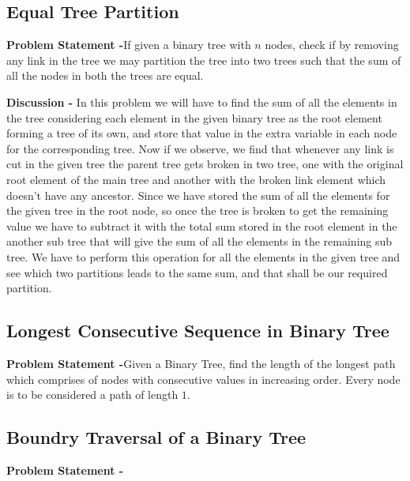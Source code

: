 \documentclass[12pt,a4paper,draft]{article}
\begin{document}
\subsection{Equal Tree Partition}
\textbf{Problem Statement -}If given a binary tree with $n$ nodes, check if by removing any link in the tree we may partition the tree into two trees such that the sum of all the nodes in both the trees are equal.
\begin{center}
\end{center}
\textbf{Discussion -} In this problem we will have to find the sum of all the elements in the tree considering each element in the given binary tree as the root element forming a tree of its own, and store that value in the extra variable in each node for the corresponding tree. Now if we observe, we find that whenever any link is cut in the given tree the parent tree gets broken in two tree, one with the original root element of the main tree and another with the broken link element which doesn't have any ancestor. Since we have stored the sum of all the elements for the given tree in the root node, so once the tree is broken to get the remaining value we have to subtract it with the total sum stored in the root element in the another sub tree that will give the sum of all the elements in the remaining sub tree. We have to perform this operation for all the elements in the given tree and see which two partitions leads to the same sum, and that shall be our required partition.
\subsection{Longest Consecutive Sequence in Binary Tree}
\textbf{Problem Statement -}Given a Binary Tree, find the length of the longest path which comprises of nodes with consecutive values in increasing order. Every node is to be considered a path of length $1$.
\subsection{Boundry Traversal of a Binary Tree}
\textbf{Problem Statement -}  
\end{document}
